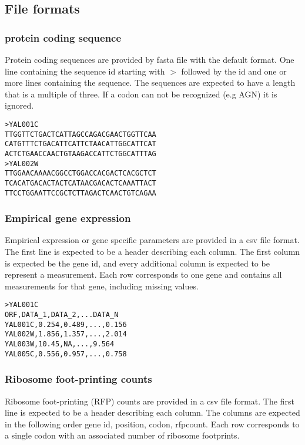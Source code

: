 \subsection{File formats}

\subsubsection{protein coding sequence}
Protein coding sequences are provided by fasta file with the default format. One line containing the sequence
id starting with $>$ followed by the id and one or more lines containing the sequence. The sequences are
expected to have a length that is a multiple of three. If a codon can not be recognized (e.g AGN) it is ignored.

\begin{verbatim}
>YAL001C
TTGGTTCTGACTCATTAGCCAGACGAACTGGTTCAA
CATGTTTCTGACATTCATTCTAACATTGGCATTCAT
ACTCTGAACCAACTGTAAGACCATTCTGGCATTTAG
>YAL002W
TTGGAACAAAACGGCCTGGACCACGACTCACGCTCT
TCACATGACACTACTCATAACGACACTCAAATTACT
TTCCTGGAATTCCGCTCTTAGACTCAACTGTCAGAA
\end{verbatim}

\subsubsection{Empirical gene expression}

Empirical expression or gene specific parameters are provided in a csv file format. The first line is expected to
be a header describing each column. The first column is expected be the gene id, and every additional column
is expected to be represent a measurement. Each row corresponds to one gene and contains all measurements
for that gene, including missing values.

\begin{verbatim}
>YAL001C
ORF,DATA_1,DATA_2,...DATA_N
YAL001C,0.254,0.489,...,0.156
YAL002W,1.856,1.357,...,2.014
YAL003W,10.45,NA,...,9.564
YAL005C,0.556,0.957,...,0.758
\end{verbatim}

\subsubsection{Ribosome foot-printing counts}

Ribosome foot-printing (RFP) counts are provided in a csv file format. The first line is expected to be a
header describing each column. The columns are expected in the following order gene id, position, codon,
rfpcount. Each row corresponds to a single codon with an associated number of ribosome footprints.

